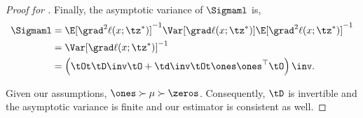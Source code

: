 \begin{proof}[Proof for ]
Finally, the asymptotic variance of $\Sigmaml$ is,
\begin{align*}
    \Sigmaml &= \E[\grad^2 \ell(x ; \tz^*)]^{-1} \Var[\grad \ell(x ; \tz^*)] \E[\grad^2 \ell(x ; \tz^*)]^{-1} \\
      &= \Var[\grad \ell(x;\tz^*)]^{-1} \\
      &= \left( \tOt \tD\inv \tO + \td\inv \tOt \ones \ones^\top \tO \right)\inv.
\end{align*}

Given our assumptions, $\ones \succ \mu \succ \zeros$. Consequently,
$\tD$ is invertible and the asymptotic variance is finite and our
estimator is consistent as well. 
\end{proof}


